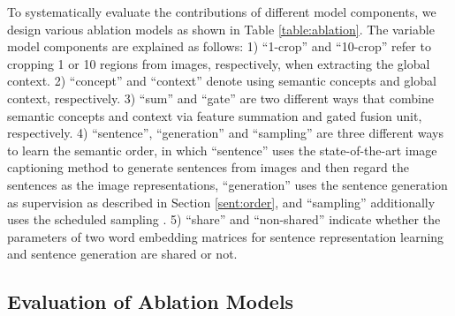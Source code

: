 \documentclass[10pt,twocolumn,letterpaper]{article}
\begin{document}
To systematically evaluate the contributions of different
model components, we design various ablation models
as shown in Table \ref{table:ablation}.
The variable model components are explained as follows:
1) ``1-crop'' and ``10-crop'' refer to cropping 1 or 10 regions from
images, respectively, when extracting the global context.
2) ``concept'' and ``context'' denote using semantic concepts and global context, respectively.
3) ``sum'' and ``gate'' are two different ways that combine semantic concepts
and context via feature summation and gated fusion unit, respectively.
4) ``sentence'', ``generation'' and ``sampling'' are three different ways to learn
the semantic order, in which ``sentence'' uses the state-of-the-art
image captioning method \cite{vinyals2017show} to generate sentences from
images and then regard the sentences as the image representations,
``generation'' uses the sentence generation as supervision
as described in Section \ref{sent:order}, and ``sampling'' additionally uses
the scheduled sampling \cite{bengio2015scheduled}.
5) ``share'' and ``non-shared'' indicate whether the parameters of
two word embedding matrices for sentence representation learning
and sentence generation are shared or not.





\subsection{Evaluation of Ablation Models} \label{sent:ablation}
\end{document}
